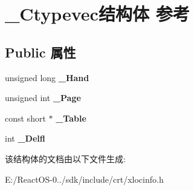 \hypertarget{struct___ctypevec}{}\section{\+\_\+\+Ctypevec结构体 参考}
\label{struct___ctypevec}
\subsection*{Public 属性}
\begin{DoxyCompactItemize}
\item 
\mbox{\label{struct___ctypevec_a6727ad39007509a95bb4ce822b4fae11}} 
unsigned long {\bfseries \+\_\+\+Hand}
\item 
\mbox{\label{struct___ctypevec_a667b894e6d460f99c9c65a20a90b69a6}} 
unsigned int {\bfseries \+\_\+\+Page}
\item 
\mbox{\label{struct___ctypevec_af0018875c0404f3b1f031f20193d4495}} 
const short $\ast$ {\bfseries \+\_\+\+Table}
\item 
\mbox{\label{struct___ctypevec_aac7147a430d0c4ae90d4f10283f1f8b1}} 
int {\bfseries \+\_\+\+Delfl}
\end{DoxyCompactItemize}


该结构体的文档由以下文件生成\+:\begin{DoxyCompactItemize}
\item 
E\+:/\+React\+O\+S-\/0../sdk/include/crt/xlocinfo.\+h\end{DoxyCompactItemize}
